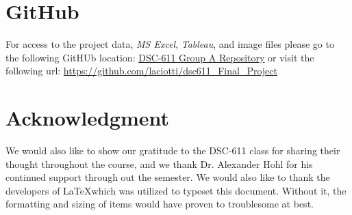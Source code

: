 \documentclass[10pt,conference]{IEEEtran}
\begin{document}
\section{GitHub}
For access to the project data, \emph{MS Excel}, \emph{Tableau}, and image files please go to the following GitHUb location:
\hyperlink{https://github.com/laciotti/dsc611_Final_Project}{DSC-611 Group A Repository} or visit the following url: \url{https://github.com/laciotti/dsc611_Final_Project}


\section*{Acknowledgment}

We would also like to show our gratitude to the DSC-611 class for sharing their thought throughout the course, and we thank Dr. Alexander Hohl for his continued support through out the semester. We would also like to thank the developers of \LaTeX which was utilized to typeset this document. Without it, the formatting and sizing of items would have proven to troublesome at best.



\nocite{*}
\end{document}
